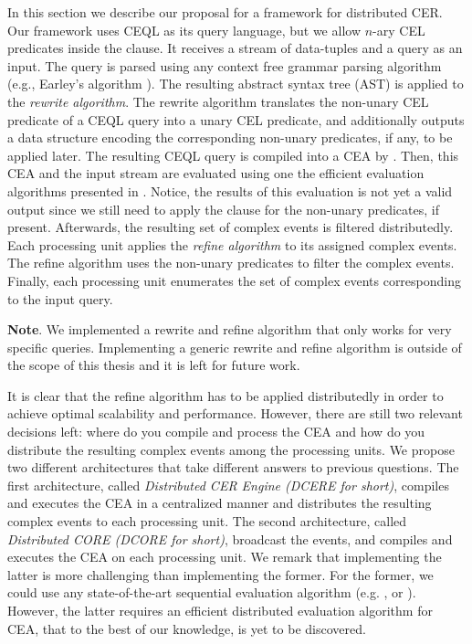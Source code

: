 In this section we describe our proposal for a framework for distributed CER. Our framework uses CEQL as its query language, but we allow $n$-ary CEL predicates inside the  clause. It receives a stream of data-tuples and a query as an input.  The query is parsed using any context free grammar parsing algorithm (e.g., Earley's algorithm \cite{earley}). The resulting abstract syntax tree (AST) is applied to the \emph{rewrite algorithm}. The rewrite algorithm translates the non-unary CEL predicate of a CEQL query into a unary CEL predicate, and additionally outputs a data structure encoding the corresponding non-unary predicates, if any, to be applied later. The resulting CEQL query is compiled into a CEA by \cite[Theorem~6.2]{formal-framework-cer}. Then, this CEA and the input stream are evaluated using one the efficient evaluation algorithms presented in \cite{formal-framework-cer, core}. Notice, the results of this evaluation is not yet a valid output since we still need to apply the  clause for the non-unary predicates, if present. Afterwards, the resulting set of complex events is filtered distributedly. Each processing unit applies the \emph{refine algorithm} to its assigned complex events. The refine algorithm uses the non-unary predicates to filter the complex events. Finally, each processing unit enumerates the set of complex events corresponding to the input query.

\textbf{Note}. We implemented a rewrite and refine algorithm that only works for very specific queries. Implementing a generic rewrite and refine algorithm is outside of the scope of this thesis and it is left for future work.

It is clear that the refine algorithm has to be applied distributedly in order to achieve optimal scalability and performance.
However, there are still two relevant decisions left: where do you compile and process the CEA and how do you distribute the resulting complex events among the processing units. We propose two different architectures that take different answers to previous questions. The first architecture, called \emph{Distributed CER Engine (DCERE for short)}, compiles and executes the CEA in a centralized manner and distributes the resulting complex events to each processing unit. The second architecture, called \emph{Distributed CORE (DCORE for short)}, broadcast the events, and compiles and executes the CEA on each processing unit. We remark that implementing the latter is more challenging than implementing the former. For the former, we could use any state-of-the-art sequential evaluation algorithm (e.g. \cite{formal-framework-cer}, or \cite{core}). However, the latter requires an efficient distributed evaluation algorithm for CEA, that to the best of our knowledge, is yet to be discovered.

